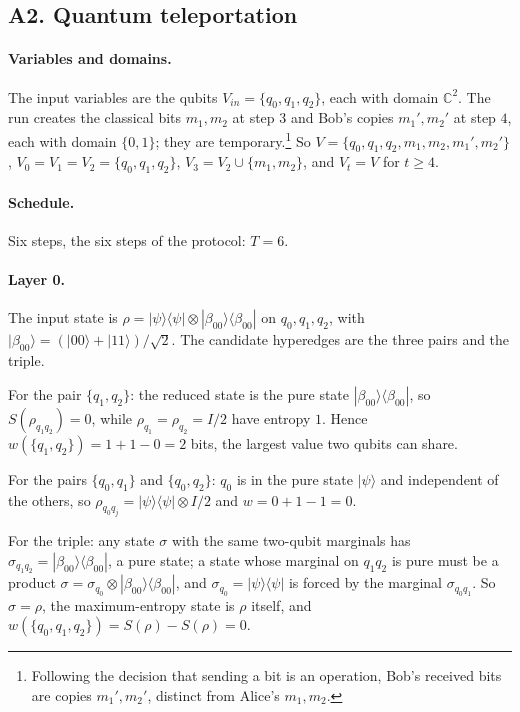\documentclass[11pt]{article}
\begin{document}
\subsection{A2. Quantum teleportation}

\paragraph{Variables and domains.} The input variables are the qubits $V_{in}=\{q_0,q_1,q_2\}$, each with domain $\mathbb{C}^2$. The run creates the classical bits $m_1,m_2$ at step $3$ and Bob's copies $m_1',m_2'$ at step $4$, each with domain $\{0,1\}$; they are temporary.\footnote{Following the decision that sending a bit is an operation, Bob's received bits are copies $m_1',m_2'$, distinct from Alice's $m_1,m_2$.} So $V=\{q_0,q_1,q_2,m_1,m_2,m_1',m_2'\}$, $V_0=V_1=V_2=\{q_0,q_1,q_2\}$, $V_3=V_2\cup\{m_1,m_2\}$, and $V_t=V$ for $t\ge4$.

\paragraph{Schedule.} Six steps, the six steps of the protocol: $T=6$.

\paragraph{Layer 0.} The input state is $\rho=|\psi\rangle\langle\psi|\otimes|\beta_{00}\rangle\langle\beta_{00}|$ on $q_0,q_1,q_2$, with $|\beta_{00}\rangle=(|00\rangle+|11\rangle)/\sqrt2$. The candidate hyperedges are the three pairs and the triple.

For the pair $\{q_1,q_2\}$: the reduced state is the pure state $|\beta_{00}\rangle\langle\beta_{00}|$, so $S(\rho_{q_1q_2})=0$, while $\rho_{q_1}=\rho_{q_2}=I/2$ have entropy $1$. Hence $w(\{q_1,q_2\})=1+1-0=2$ bits, the largest value two qubits can share.

For the pairs $\{q_0,q_1\}$ and $\{q_0,q_2\}$: $q_0$ is in the pure state $|\psi\rangle$ and independent of the others, so $\rho_{q_0q_j}=|\psi\rangle\langle\psi|\otimes I/2$ and $w=0+1-1=0$.

For the triple: any state $\sigma$ with the same two-qubit marginals has $\sigma_{q_1q_2}=|\beta_{00}\rangle\langle\beta_{00}|$, a pure state; a state whose marginal on $q_1q_2$ is pure must be a product $\sigma=\sigma_{q_0}\otimes|\beta_{00}\rangle\langle\beta_{00}|$, and $\sigma_{q_0}=|\psi\rangle\langle\psi|$ is forced by the marginal $\sigma_{q_0q_1}$. So $\sigma=\rho$, the maximum-entropy state is $\rho$ itself, and $w(\{q_0,q_1,q_2\})=S(\rho)-S(\rho)=0$.
\end{document}
